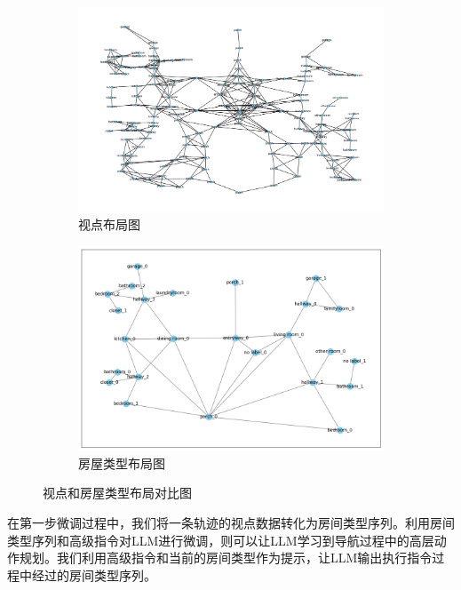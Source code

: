 \documentclass[bachelor]{thesis-uestc}
\begin{document}
\begin{figure}[htbp]
    \centering  %
    \begin{subfigure}[b]{0.48\textwidth}
        \centering    %
        \includegraphics[width=\textwidth]{1151-042817.png} %
        \caption{视点布局图}
        \label{fig:sub1}
    \end{subfigure}
    \hfill %
    \begin{subfigure}[b]{0.48\textwidth} 
        \centering    %
        \includegraphics[width=\textwidth]{1202-042817.png}
        \caption{房屋类型布局图}
        \label{fig:sub2}
    \end{subfigure}
    \caption{视点和房屋类型布局对比图}    %
    \label{vproom}    %
\end{figure}

在第一步微调过程中，我们将一条轨迹的视点数据转化为房间类型序列。利用房间类型序列和高级指令对LLM进行微调，则可以让LLM学习到导航过程中的高层动作规划。我们利用高级指令和当前的房间类型作为提示，让LLM输出执行指令过程中经过的房间类型序列。
\end{document}
